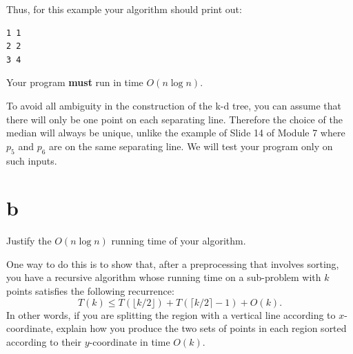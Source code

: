 \documentclass[12pt]{article}
\begin{document}
\begin{enumerate}
Thus, for this example your algorithm should print out:
\begin{verbatim}
1 1
2 2
3 4 
\end{verbatim}
Your program {\bf must} run in time $O(n \log n)$.

To avoid all ambiguity in the construction of the k-d tree, you can assume that 
there will only be one point on each separating line. 
Therefore the choice of the median will always be unique, 
unlike the example of Slide 14 of Module 7 where $p_5$ and $p_6$ are on the same separating line. 
We will test your program only on such inputs.

\part{b} Justify the $O(n \log n)$ running time of your algorithm.  

One way to do this is to show that, after a preprocessing that involves sorting, 
you have a recursive algorithm whose running time on a sub-problem with $k$ points
satisfies the following recurrence: 
$$T(k) \leq T(\lfloor k/2\rfloor) + T(\lceil k/2 \rceil-1)+ O(k).$$
In other words, if you are splitting the region with a
vertical line according to $x$-coordinate, 
explain how you produce the two sets of points in each
region sorted according to their $y$-coordinate in time $O(k)$.
\end{enumerate}

\end{document}
